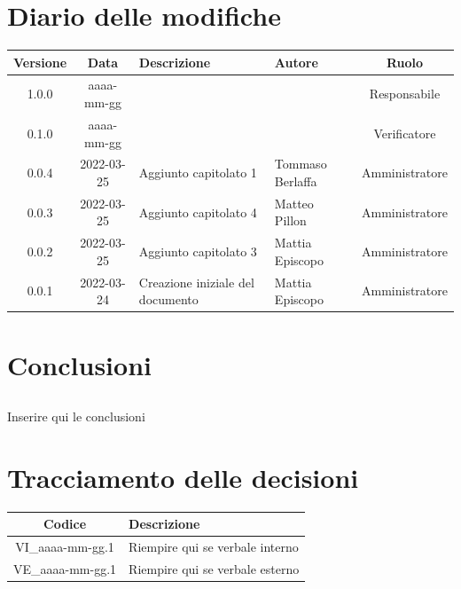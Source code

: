\documentclass[12pt, a4paper,table]{article}
\begin{document}
	\section*{Diario delle modifiche}
	\begin{center}
	\renewcommand{\arraystretch}{1.8} %
	\begin{tabular}{ |c|c|m{12em}|m{7em}|c| }
	\hline
	\textbf{Versione} & \textbf{Data} & \textbf{Descrizione} &  \textbf{Autore} &  \textbf{Ruolo} \\
	\hline
	1.0.0 & aaaa-mm-gg &  & \docApprovazione & Responsabile\\ %
	\hline
	0.1.0 & aaaa-mm-gg &  & \docVerificatori & Verificatore\\ %
	\hline
		0.0.4 & 2022-03-25 & Aggiunto capitolato 1 & Tommaso \newline Berlaffa & Amministratore\\  %
		\hline
		0.0.3 & 2022-03-25 & Aggiunto capitolato 4 & Matteo \newline Pillon & Amministratore\\  %
    	\hline
    	0.0.2 & 2022-03-25 & Aggiunto capitolato 3 & Mattia \newline Episcopo & 
    	Amministratore\\  %
    	\hline
    	0.0.1 & 2022-03-24 & Creazione iniziale del documento & Mattia \newline Episcopo & Amministratore\\  %
	\hline
	\end{tabular}
	\end{center}
	\newpage
	
	\tableofcontents
	\newpage
	
	\newpage
	
	\newpage
		
	\newpage
	
	\newpage
	\section{Conclusioni}
	    \subsection {} Inserire qui le conclusioni
	\newpage
	
	\section*{Tracciamento delle decisioni}
	\renewcommand{\arraystretch}{1.8} %
	\begin{tabular}{ |c|l| }
		\hline
		\textbf{Codice} & \textbf{Descrizione} \\
		\hline
		VI\_aaaa-mm-gg.1 & Riempire qui se verbale interno\\ \hline
		VE\_aaaa-mm-gg.1 & Riempire qui se verbale esterno\\ \hline
	\end{tabular}
\end{document}
